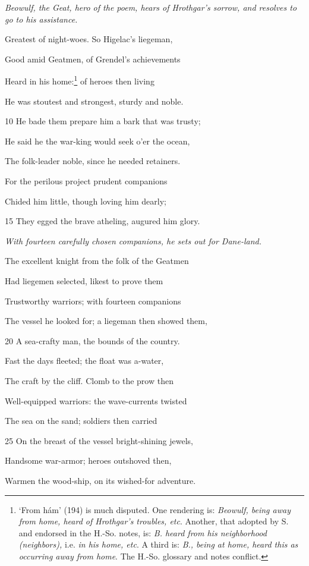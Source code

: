 \emph{Beowulf, the Geat,
hero of the poem,
hears of Hrothgar’s
sorrow, and resolves
to go to his
assistance.}

Greatest of night-woes. So Higelac’s liegeman,

Good amid Geatmen, of Grendel’s achievements

Heard in his home:\footnote{‘From hám’ (194) is much disputed. One rendering is: \emph{Beowulf, being
away from home, heard of Hrothgar’s troubles, etc}. Another, that adopted by
S. and endorsed in the H.-So. notes, is: \emph{B. heard from his neighborhood (neighbors),}
i.e. \emph{in his home, etc}. A third is: \emph{B., being at home, heard this as
occurring away from home}. The H.-So. glossary and notes conflict.} of heroes then living

He was stoutest and strongest, sturdy and noble.

10
He bade them prepare him a bark that was trusty;

He said he the war-king would seek o’er the ocean,

The folk-leader noble, since he needed retainers.

For the perilous project prudent companions

Chided him little, though loving him dearly;

15
They egged the brave atheling, augured him glory.

\emph{With fourteen carefully
chosen companions,
he sets out
for Dane-land.}

The excellent knight from the folk of the Geatmen

Had liegemen selected, likest to prove them

Trustworthy warriors; with fourteen companions

The vessel he looked for; a liegeman then showed them,

20
A sea-crafty man, the bounds of the country.

Fast the days fleeted; the float was a-water,

The craft by the cliff. Clomb to the prow then

Well-equipped warriors: the wave-currents twisted

The sea on the sand; soldiers then carried

25
On the breast of the vessel bright-shining jewels,

Handsome war-armor; heroes outshoved then,

Warmen the wood-ship, on its wished-for adventure.

